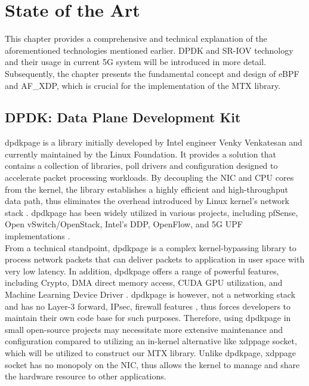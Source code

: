 \chapter{State of the Art}\label{sec:sota}\minitoc\vspace{.5cm}
This chapter provides a comprehensive and technical explanation of the aforementioned technologies mentioned earlier. 
DPDK and SR-IOV technology and their usage in current 5G system will be introduced in more detail.
Subsequently, the chapter presents the fundamental concept and design of eBPF and AF\_XDP, which is crucial for the implementation of the MTX library.

\section{DPDK: Data Plane Development Kit}
\ac{dpdkpage} is a library initially developed by Intel engineer Venky Venkatesan and currently maintained by the Linux Foundation. 
It provides a solution that contains a collection of libraries, poll drivers and configuration designed to accelerate packet processing workloads. 
By decoupling the NIC and CPU cores from the kernel, the library establishes a highly efficient and high-throughput data path, thus eliminates the overhead introduced by Linux kernel's network stack \cite{kourtis_enhancing_2015}. 
\ac{dpdkpage} has been widely utilized in various projects, including pfSense, Open vSwitch/OpenStack, Intel's DDP, OpenFlow, and 5G UPF implementations \cite{intel_ddp_ethernet_800}\cite{pongracz_removing_2013}\cite{zte_5g_core_upf_impl}\cite{nec_upf_whitepaper}. 
\\

From a technical standpoint, \ac{dpdkpage} is a complex kernel-bypassing library to process network packets that can deliver packets to application in user space with very low latency.
In addition, \ac{dpdkpage} offers a range of powerful features, including Crypto, DMA direct memory access, CUDA GPU utilization, and Machine Learning Device Driver \cite{dpdk_guide_page}. 
\ac{dpdkpage} is however, not a networking stack and has no Layer-3 forward, IPsec, firewall features \cite{old_dpdk_page}, thus forces developers to maintain their own code base for such purposes.
Therefore, using \ac{dpdkpage} in small open-source projects may necessitate more extensive maintenance and configuration compared to utilizing an in-kernel alternative like \ac{xdppage} socket, which will be utilized to construct our MTX library.
Unlike \ac{dpdkpage}, \ac{xdppage} socket has no monopoly on the \ac{NIC}, thus allows the kernel to manage and share the hardware resource to other applications.

